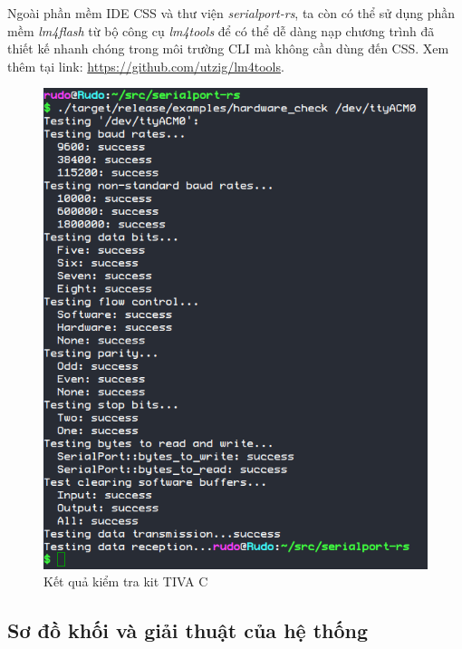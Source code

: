 Ngoài phần mềm IDE CSS và thư viện \emph{serialport-rs}, ta còn có thể sử dụng phần mềm \emph{lm4flash} từ bộ công cụ \emph{lm4tools} để có thể dễ dàng nạp chương trình đã thiết kế nhanh chóng trong môi trường CLI mà không cần dùng đến CSS.
Xem thêm tại link: \url{https://github.com/utzig/lm4tools}.

\newpage
\begin{figure}[ht!]
\centering
\includegraphics[scale=1]{images/hardware_check_result.png}
\caption{Kết quả kiểm tra kit TIVA C}
\label{fig:hardware_check_result}
\end{figure}

\newpage
\subsection{Sơ đồ khối và giải thuật của hệ thống}
